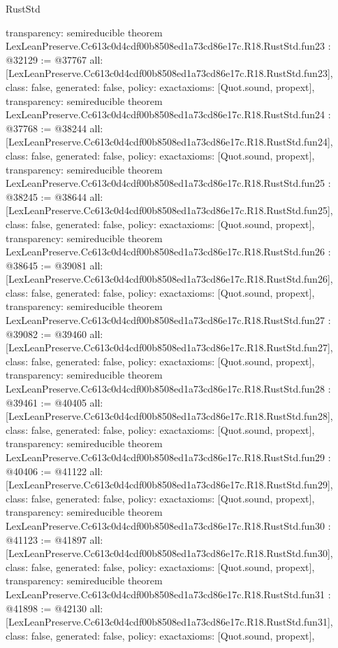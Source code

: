 \begin{lexlean}{RustStd}
\begin{coremodule}
{  transparency: semireducible
}
theorem LexLeanPreserve.Cc613c0d4cdf00b8508ed1a73cd86e17c.R18.RustStd.fun23 : @32129 := @37767 {
  all: [LexLeanPreserve.Cc613c0d4cdf00b8508ed1a73cd86e17c.R18.RustStd.fun23],
  class: false,
  generated: false,
  policy: exact{axioms: [Quot.sound, propext]},
  transparency: semireducible
}
theorem LexLeanPreserve.Cc613c0d4cdf00b8508ed1a73cd86e17c.R18.RustStd.fun24 : @37768 := @38244 {
  all: [LexLeanPreserve.Cc613c0d4cdf00b8508ed1a73cd86e17c.R18.RustStd.fun24],
  class: false,
  generated: false,
  policy: exact{axioms: [Quot.sound, propext]},
  transparency: semireducible
}
theorem LexLeanPreserve.Cc613c0d4cdf00b8508ed1a73cd86e17c.R18.RustStd.fun25 : @38245 := @38644 {
  all: [LexLeanPreserve.Cc613c0d4cdf00b8508ed1a73cd86e17c.R18.RustStd.fun25],
  class: false,
  generated: false,
  policy: exact{axioms: [Quot.sound, propext]},
  transparency: semireducible
}
theorem LexLeanPreserve.Cc613c0d4cdf00b8508ed1a73cd86e17c.R18.RustStd.fun26 : @38645 := @39081 {
  all: [LexLeanPreserve.Cc613c0d4cdf00b8508ed1a73cd86e17c.R18.RustStd.fun26],
  class: false,
  generated: false,
  policy: exact{axioms: [Quot.sound, propext]},
  transparency: semireducible
}
theorem LexLeanPreserve.Cc613c0d4cdf00b8508ed1a73cd86e17c.R18.RustStd.fun27 : @39082 := @39460 {
  all: [LexLeanPreserve.Cc613c0d4cdf00b8508ed1a73cd86e17c.R18.RustStd.fun27],
  class: false,
  generated: false,
  policy: exact{axioms: [Quot.sound, propext]},
  transparency: semireducible
}
theorem LexLeanPreserve.Cc613c0d4cdf00b8508ed1a73cd86e17c.R18.RustStd.fun28 : @39461 := @40405 {
  all: [LexLeanPreserve.Cc613c0d4cdf00b8508ed1a73cd86e17c.R18.RustStd.fun28],
  class: false,
  generated: false,
  policy: exact{axioms: [Quot.sound, propext]},
  transparency: semireducible
}
theorem LexLeanPreserve.Cc613c0d4cdf00b8508ed1a73cd86e17c.R18.RustStd.fun29 : @40406 := @41122 {
  all: [LexLeanPreserve.Cc613c0d4cdf00b8508ed1a73cd86e17c.R18.RustStd.fun29],
  class: false,
  generated: false,
  policy: exact{axioms: [Quot.sound, propext]},
  transparency: semireducible
}
theorem LexLeanPreserve.Cc613c0d4cdf00b8508ed1a73cd86e17c.R18.RustStd.fun30 : @41123 := @41897 {
  all: [LexLeanPreserve.Cc613c0d4cdf00b8508ed1a73cd86e17c.R18.RustStd.fun30],
  class: false,
  generated: false,
  policy: exact{axioms: [Quot.sound, propext]},
  transparency: semireducible
}
theorem LexLeanPreserve.Cc613c0d4cdf00b8508ed1a73cd86e17c.R18.RustStd.fun31 : @41898 := @42130 {
  all: [LexLeanPreserve.Cc613c0d4cdf00b8508ed1a73cd86e17c.R18.RustStd.fun31],
  class: false,
  generated: false,
  policy: exact{axioms: [Quot.sound, propext]},
}
\end{coremodule}
\end{lexlean}
